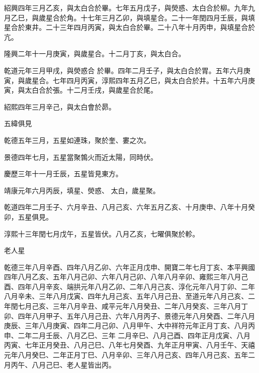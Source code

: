 \begin{pinyinscope}
 紹興四年三月乙亥，與太白合於畢。七年五月戊子，與熒惑、太白合於柳。九年九月乙巳，與歲星合於角。十七年三月乙卯，與填星合。二十一年閏四月壬辰，與填星合於東井。二十三年四月丙寅，與太白合於畢。二十八年十月丙申，與填星合於亢。



 隆興二年十一月庚寅，與歲星合。十二月丁亥，與太白合。



 乾道元年三月甲戌，與熒惑合
 於畢。四年二月壬子，與太白合於胃。五年六月庚寅，與歲星合。七年四月丙寅，淳熙四年五月乙巳，與太白合於井。十五年六月庚寅，與太白合於張。十二月壬戌，與歲星合於尾。



 紹熙四年三月辛己，與太白會於昴。



 五緯俱見



 乾德五年三月，五星如連珠，聚於奎、婁之次。



 景德四年七月，五星當聚鶉火而近太陽，同時伏。



 慶歷三年十一月壬辰，五星皆見東方。



 靖康元年六月丙辰，填星、熒惑、
 太白，歲星聚。



 乾道四年二月壬子、六月辛丑、八月己亥、六年五月乙亥、十月庚申、八年十月癸卯，五星俱見。



 淳熙十三年閏七月戊午，五星皆伏。八月乙亥，七曜俱聚於軫。



 老人星



 乾德三年八月辛酉、四年八月乙卯、六年正月戊申、開寶二年七月丁亥、本平興國四年八月乙亥、五年八月己卯、六年八月己卯、八年八月辛卯、雍熙三年八月己
 酉、四年八月辛亥、端拱元年八月乙卯、二年八月己亥、淳化元年八月丁卯、二年八月辛未、三年八月戊寅、四年九月己亥、五年八月己丑、至道元年八月己亥、二年閏七月己亥、三年八月辛丑、咸平元年八月癸丑、二年八月癸亥、三年八月丁卯、四年八月甲子、五年八月己丑、六年八月丙子、景德元年八月癸酉、二年八月庚辰、三年八月庚寅、四年二月己卯、八月甲午、大中祥符元年正月丁亥、八月丙申、二年二月壬辰、八月乙巳、三年
 二月辛巳、八月己酉、四年正月戊寅、八月丙寅、七年正月癸丑、八月己巳、八年七月癸酉、九年正月甲寅、八月壬午、天禧元年八月癸巳、二年正月丁巳、八月辛卯、三年八月己亥、四年八月己亥、五年二月丙午、八月己巳、老人星皆出丙。




\end{pinyinscope}
